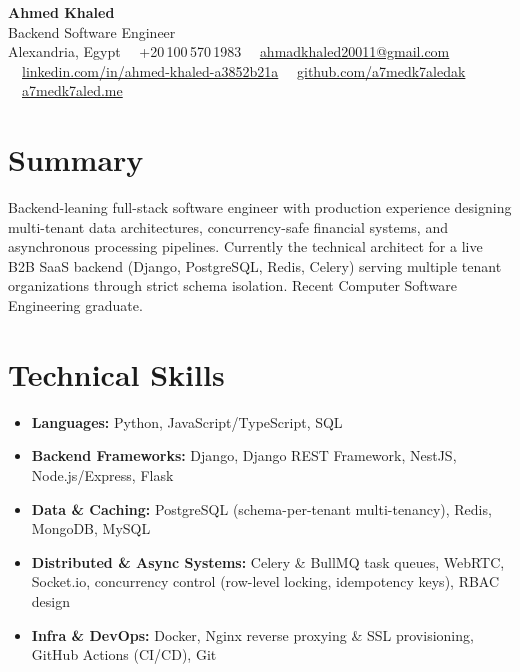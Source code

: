 \documentclass[10pt,letterpaper]{article}
\newcommand{\sectionrule}{\vspace{-1pt}{\color{hairline}\hrule height 0.6pt}\vspace{2pt}}
\begin{document}
\begin{center}
    {\fontsize{20}{22}\selectfont\textbf{Ahmed Khaled}}\\[1pt]
    {\color{accent}\fontsize{10}{11}\selectfont Backend Software Engineer}\\[2pt]
    {\footnotesize\color{muted}
      Alexandria, Egypt \ \textperiodcentered\ +20\,100\,570\,1983 \ \textperiodcentered\
      \href{mailto:ahmadkhaled20011@gmail.com}{ahmadkhaled20011@gmail.com} \ \textperiodcentered\
      \href{https://www.linkedin.com/in/ahmed-khaled-a3852b21a/}{linkedin.com/in/ahmed-khaled-a3852b21a} \ \textperiodcentered\
      \href{https://github.com/a7medk7aledak}{github.com/a7medk7aledak} \ \textperiodcentered\
      \href{https://a7medk7aled.me}{a7medk7aled.me}
    }
\end{center}

\section*{Summary}
\sectionrule
{\small
Backend-leaning full-stack software engineer with production experience designing multi-tenant data
architectures, concurrency-safe financial systems, and asynchronous processing pipelines. Currently the
technical architect for a live B2B SaaS backend (Django, PostgreSQL, Redis, Celery) serving multiple tenant
organizations through strict schema isolation. Recent Computer Software Engineering graduate.
}

\section*{Technical Skills}
\sectionrule
{\small
\begin{itemize}
    \item \textbf{Languages:} Python, JavaScript/TypeScript, SQL
    \item \textbf{Backend Frameworks:} Django, Django REST Framework, NestJS, Node.js/Express, Flask
    \item \textbf{Data \& Caching:} PostgreSQL (schema-per-tenant multi-tenancy), Redis, MongoDB, MySQL
    \item \textbf{Distributed \& Async Systems:} Celery \& BullMQ task queues, WebRTC, Socket.io, concurrency
    control (row-level locking, idempotency keys), RBAC design
    \item \textbf{Infra \& DevOps:} Docker, Nginx reverse proxying \& SSL provisioning, GitHub Actions (CI/CD), Git
\end{itemize}
}
\end{document}
